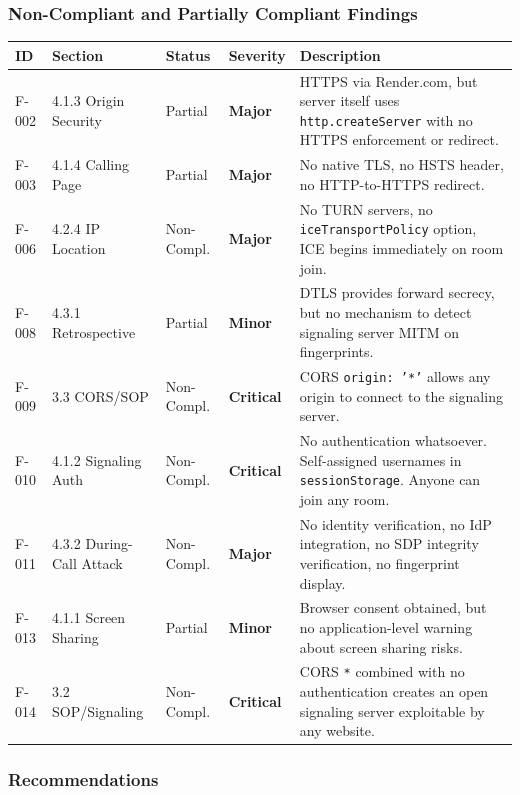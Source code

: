 \documentclass[11pt,letterpaper]{article}
\newcommand{\sevcritical}{\textcolor{critical}{\textbf{Critical}}}
\newcommand{\sevmajor}{\textcolor{major}{\textbf{Major}}}
\newcommand{\sevminor}{\textcolor{minor!80!black}{\textbf{Minor}}}
\begin{document}
\subsubsection{Non-Compliant and Partially Compliant Findings}

\begin{longtable}{C{1cm}L{2.8cm}C{1.5cm}C{1.2cm}L{6.7cm}}
\toprule
\textbf{ID} & \textbf{Section} & \textbf{Status} & \textbf{Severity} & \textbf{Description} \\
\midrule
\endhead
F-002 & 4.1.3 Origin Security & Partial & \sevmajor & HTTPS via Render.com, but server itself uses \texttt{http.createServer} with no HTTPS enforcement or redirect. \\
\midrule
F-003 & 4.1.4 Calling Page & Partial & \sevmajor & No native TLS, no HSTS header, no HTTP-to-HTTPS redirect. \\
\midrule
F-006 & 4.2.4 IP Location & Non-Compl. & \sevmajor & No TURN servers, no \texttt{iceTransportPolicy} option, ICE begins immediately on room join. \\
\midrule
F-008 & 4.3.1 Retrospective & Partial & \sevminor & DTLS provides forward secrecy, but no mechanism to detect signaling server MITM on fingerprints. \\
\midrule
F-009 & 3.3 CORS/SOP & Non-Compl. & \sevcritical & CORS \texttt{origin: '*'} allows any origin to connect to the signaling server. \\
\midrule
F-010 & 4.1.2 Signaling Auth & Non-Compl. & \sevcritical & No authentication whatsoever. Self-assigned usernames in \texttt{sessionStorage}. Anyone can join any room. \\
\midrule
F-011 & 4.3.2 During-Call Attack & Non-Compl. & \sevmajor & No identity verification, no IdP integration, no SDP integrity verification, no fingerprint display. \\
\midrule
F-013 & 4.1.1 Screen Sharing & Partial & \sevminor & Browser consent obtained, but no application-level warning about screen sharing risks. \\
\midrule
F-014 & 3.2 SOP/Signaling & Non-Compl. & \sevcritical & CORS \texttt{*} combined with no authentication creates an open signaling server exploitable by any website. \\
\bottomrule
\end{longtable}

\subsubsection{Recommendations}
\end{document}
